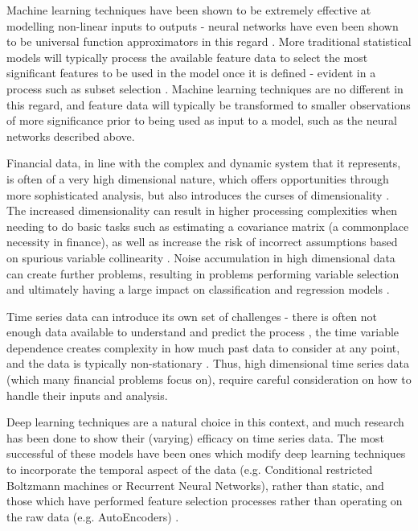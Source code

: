 \documentclass[a4paper,11pt,oneside]{article}
\theoremstyle{plain}
\theoremstyle{definition}
\begin{document}
	Machine learning techniques have been shown to be extremely effective at modelling non-linear inputs 
	to outputs - neural networks have even been shown to be universal function approximators in this regard \citep{Hornik}. 
	More traditional statistical models will typically process the available feature data to select the most significant 
	features to be used in the model once it is defined - evident in a process such as subset selection \citep{Schaefer}. 
	Machine learning techniques are no different in this regard, and feature data will typically be transformed to smaller 
	observations of more significance prior to being used as input to a model, such as the neural networks described above.
	\hfill \break 
	
	Financial data, in line with the complex and dynamic system that it represents, is often of a very high dimensional 
	nature, which offers opportunities through more sophisticated analysis, but also introduces the curses of
	dimensionality \citep{Donoho}. The increased dimensionality can result in higher processing complexities when needing to 
	do basic tasks such as estimating a covariance matrix (a commonplace necessity in finance), as well as increase 
	the risk of incorrect assumptions based on spurious variable collinearity \citep{Fan1}. Noise accumulation in high 
	dimensional data can create further problems, resulting in problems performing variable selection and ultimately 
	having a large impact on classification and regression models \citep{Fan2}.
	\hfill \break 
	
	Time series data can introduce its own set of challenges - there is often not enough data available to understand 
	and predict the process \citep{Fama}, the time variable dependence creates complexity in how much past 
	data to consider at any point, and the data is typically non-stationary \citep{Langkvist}. Thus, high dimensional time 
	series data (which many financial problems focus on), require careful consideration on how to handle their inputs 
	and analysis.
	\hfill \break 
	
	Deep learning techniques are a natural choice in this context, and much research has been done to show their 
	(varying) efficacy on time series data. The most successful of these models have been ones which modify deep 
	learning techniques to incorporate the temporal aspect of the data (e.g. Conditional restricted Boltzmann 
	machines or Recurrent Neural Networks), rather than static, and those which have performed feature selection
	processes rather than operating on the raw data (e.g. AutoEncoders) \citep{Langkvist}. 
	\hfill \break 
	
\end{document}

